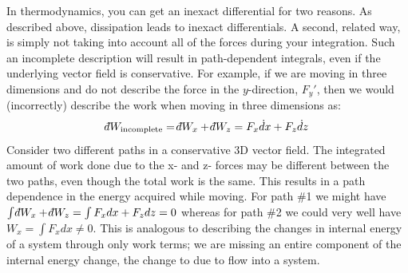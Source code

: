 \documentclass[12pt]{article}
\def\dbar{{\mathchar'26\mkern-12mu d}}
\begin{document}
 In thermodynamics, you can get an inexact differential for two reasons. As described above, dissipation leads to inexact differentials. A second, related way, is simply not taking into account all of the forces during your integration. Such an incomplete description will result in path-dependent integrals, even if the underlying vector field is conservative. For example, if we are moving in three dimensions and do not describe the force in the $y$-direction, $F_y'$, then we would (incorrectly) describe the work when moving in three dimensions as:
\begin{align*}
\dbar W_\text{incomplete} = \dbar W_x + \dbar W_z = F_x \dot dx + F_z \dot dz 
\end{align*}
Consider two different paths in a conservative 3D vector field.  The integrated amount of work done due to the x- and z- forces may be different between the two paths, even though the total work is the same. This results in a path dependence in the energy acquired while moving.  For path \#1 we might have $\int \dbar W_x + \dbar W_z = \int F_x dx + F_z dz = 0$ whereas for path \#2 we could very well have $W_x = \int F_x dx \neq 0$.  This is analogous to describing the changes in internal energy of a system through only work terms; we are missing an entire component of the internal energy change, the change to due to  flow into a system.
\end{document}
